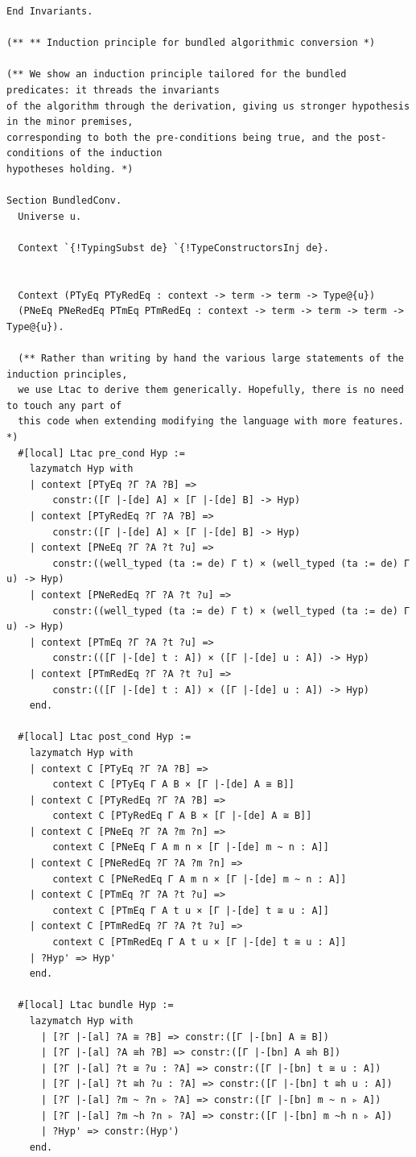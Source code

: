 \begin{lstlisting}
End Invariants.

(** ** Induction principle for bundled algorithmic conversion *)

(** We show an induction principle tailored for the bundled predicates: it threads the invariants
of the algorithm through the derivation, giving us stronger hypothesis in the minor premises,
corresponding to both the pre-conditions being true, and the post-conditions of the induction
hypotheses holding. *)

Section BundledConv.
  Universe u.

  Context `{!TypingSubst de} `{!TypeConstructorsInj de}.


  Context (PTyEq PTyRedEq : context -> term -> term -> Type@{u})
  (PNeEq PNeRedEq PTmEq PTmRedEq : context -> term -> term -> term -> Type@{u}).

  (** Rather than writing by hand the various large statements of the induction principles,
  we use Ltac to derive them generically. Hopefully, there is no need to touch any part of
  this code when extending modifying the language with more features. *)
  #[local] Ltac pre_cond Hyp :=
    lazymatch Hyp with
    | context [PTyEq ?Γ ?A ?B] =>
        constr:([Γ |-[de] A] × [Γ |-[de] B] -> Hyp)
    | context [PTyRedEq ?Γ ?A ?B] =>
        constr:([Γ |-[de] A] × [Γ |-[de] B] -> Hyp)
    | context [PNeEq ?Γ ?A ?t ?u] =>
        constr:((well_typed (ta := de) Γ t) × (well_typed (ta := de) Γ u) -> Hyp)
    | context [PNeRedEq ?Γ ?A ?t ?u] =>
        constr:((well_typed (ta := de) Γ t) × (well_typed (ta := de) Γ u) -> Hyp)
    | context [PTmEq ?Γ ?A ?t ?u] =>
        constr:(([Γ |-[de] t : A]) × ([Γ |-[de] u : A]) -> Hyp)
    | context [PTmRedEq ?Γ ?A ?t ?u] =>
        constr:(([Γ |-[de] t : A]) × ([Γ |-[de] u : A]) -> Hyp)
    end.

  #[local] Ltac post_cond Hyp :=
    lazymatch Hyp with
    | context C [PTyEq ?Γ ?A ?B] =>
        context C [PTyEq Γ A B × [Γ |-[de] A ≅ B]]
    | context C [PTyRedEq ?Γ ?A ?B] =>
        context C [PTyRedEq Γ A B × [Γ |-[de] A ≅ B]]
    | context C [PNeEq ?Γ ?A ?m ?n] =>
        context C [PNeEq Γ A m n × [Γ |-[de] m ~ n : A]]
    | context C [PNeRedEq ?Γ ?A ?m ?n] =>
        context C [PNeRedEq Γ A m n × [Γ |-[de] m ~ n : A]]
    | context C [PTmEq ?Γ ?A ?t ?u] =>
        context C [PTmEq Γ A t u × [Γ |-[de] t ≅ u : A]]
    | context C [PTmRedEq ?Γ ?A ?t ?u] =>
        context C [PTmRedEq Γ A t u × [Γ |-[de] t ≅ u : A]]
    | ?Hyp' => Hyp'
    end.

  #[local] Ltac bundle Hyp :=
    lazymatch Hyp with
      | [?Γ |-[al] ?A ≅ ?B] => constr:([Γ |-[bn] A ≅ B])
      | [?Γ |-[al] ?A ≅h ?B] => constr:([Γ |-[bn] A ≅h B])
      | [?Γ |-[al] ?t ≅ ?u : ?A] => constr:([Γ |-[bn] t ≅ u : A])
      | [?Γ |-[al] ?t ≅h ?u : ?A] => constr:([Γ |-[bn] t ≅h u : A])
      | [?Γ |-[al] ?m ~ ?n ▹ ?A] => constr:([Γ |-[bn] m ~ n ▹ A])
      | [?Γ |-[al] ?m ~h ?n ▹ ?A] => constr:([Γ |-[bn] m ~h n ▹ A])
      | ?Hyp' => constr:(Hyp')
    end.


\end{lstlisting}
